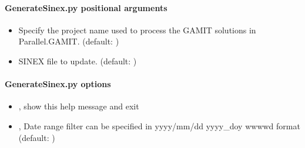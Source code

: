\documentclass[letterpaper,10pt,english]{sphinxmanual}
\begin{document}
\paragraph{GenerateSinex.py positional arguments}
\label{\detokenize{com:GenerateSinex.py-positional-arguments}}\begin{itemize}
\item {} 
\sphinxAtStartPar
{\hyperref[\detokenize{com:GenerateSinex.py-_project-name_}]{}} \sphinxhyphen{} Specify the project name used to process the GAMIT solutions in Parallel.GAMIT. (default: )

\item {} 
\sphinxAtStartPar
{\hyperref[\detokenize{com:GenerateSinex.py-_project-name_}]{}} \sphinxhyphen{} SINEX file to update. (default: )

\end{itemize}


\paragraph{GenerateSinex.py options}
\label{\detokenize{com:GenerateSinex.py-options}}\begin{itemize}
\item {} 
\sphinxAtStartPar
{\hyperref[\detokenize{com:GenerateSinex.py--h}]{}}, {\hyperref[\detokenize{com:GenerateSinex.py---help}]{}} \sphinxhyphen{} show this help message and exit

\item {} 
\sphinxAtStartPar
{\hyperref[\detokenize{com:GenerateSinex.py--d}]{}} , {\hyperref[\detokenize{com:GenerateSinex.py---date_filter}]{}}  \sphinxhyphen{} Date range filter can be specified in yyyy/mm/dd yyyy\_doy  wwww\sphinxhyphen{}d format (default: )

\end{itemize}
\end{document}

